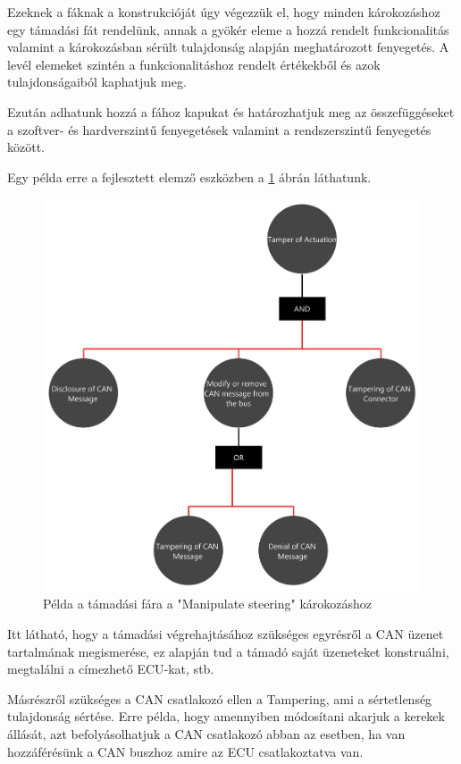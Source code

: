 Ezeknek a fáknak a konstrukcióját úgy végezzük el, hogy minden károkozáshoz egy támadási fát rendelünk, annak a gyökér eleme a hozzá rendelt funkcionalitás valamint a károkozásban sérült tulajdonság alapján meghatározott fenyegetés. A levél elemeket szintén a funkcionalitáshoz rendelt értékekből és azok tulajdonságaiból kaphatjuk meg.

Ezután adhatunk hozzá a fához kapukat és határozhatjuk meg az összefüggéseket a szoftver- és hardverszintű fenyegetések valamint a rendszerszintű fenyegetés között.

Egy példa erre a fejlesztett elemző eszközben a \ref{fig:04_attack_tree} ábrán láthatunk.

\begin{figure}[!ht]
	\centering
	\includegraphics[width=130mm, keepaspectratio]{figures/04_attack_tree.png}
	\caption{Példa a támadási fára a "Manipulate steering" károkozáshoz}
	\label{fig:04_attack_tree}
\end{figure} 

Itt látható, hogy a támadási végrehajtásához szükséges egyrésről a CAN üzenet tartalmának megismerése, ez alapján tud a támadó saját üzeneteket konstruálni, megtalálni a címezhető ECU-kat, stb. 

Másrészről szükséges a CAN csatlakozó ellen a Tampering, ami a sértetlenség tulajdonság sértése. Erre példa, hogy amennyiben módosítani akarjuk a kerekek állását, azt befolyásolhatjuk a CAN csatlakozó abban az esetben, ha van hozzáférésünk a CAN buszhoz amire az ECU csatlakoztatva van.

